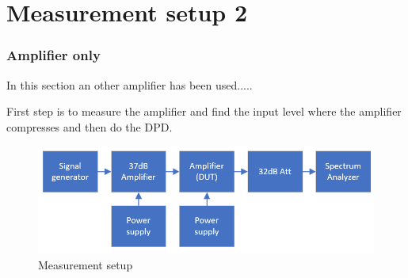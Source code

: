 


\section{Measurement setup 2}

\subsubsection{Amplifier only}

In this section an other amplifier has been used.....

First step is to measure the amplifier and find the input level where the amplifier compresses and then do the DPD. 

\begin{figure}[H]
\centering 
\includegraphics[scale = 0.5]{figures/measurement/meas_set_cree_1.png}
\caption{Measurement setup}
\label{fig:meas2_cree1}
\end{figure} 


